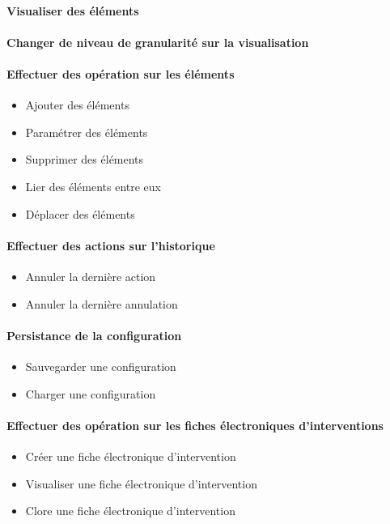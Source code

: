 {
	\paragraph{ Visualiser des éléments}
	\paragraph{ Changer de niveau de granularité sur la visualisation}
}
{
\paragraph{Effectuer des opération sur les éléments }
\begin{itemize}
	\item Ajouter des éléments
	\item Paramétrer des éléments
	\item Supprimer des éléments
	\item Lier des éléments entre eux
	\item Déplacer des éléments
\end{itemize}

\paragraph{Effectuer des actions sur l'historique}
\begin{itemize}
	\item Annuler la dernière action
	\item Annuler la dernière annulation
\end{itemize}

\paragraph{Persistance de la configuration}
\begin{itemize}
	\item Sauvegarder une configuration
	\item Charger une configuration
\end{itemize}

\paragraph{Effectuer des opération sur les fiches électroniques d'interventions}
\begin{itemize}
	\item Créer une fiche électronique d'intervention
	\item Visualiser une fiche électronique d'intervention
	\item Clore une fiche électronique d'intervention
\end{itemize}

}
